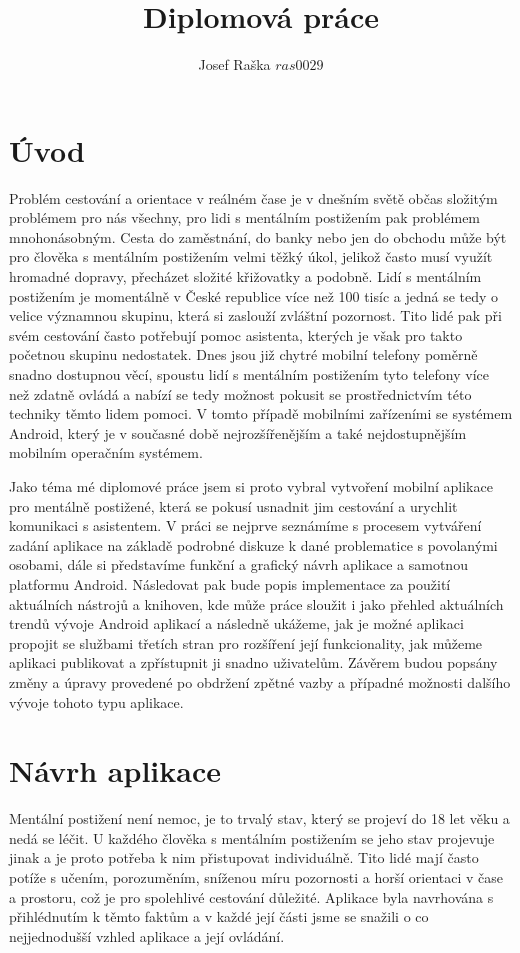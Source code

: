 \documentclass[czech,master,public,dept460,male,java,cpdeclaration]{diploma}
\title{Diplomová práce}
\author{Josef Raška \(ras0029\)}
\begin{document}
\MakeTitlePages
{}


\newpage

\section{Úvod}
Problém cestování a orientace v reálném čase je v dnešním světě občas složitým problémem pro nás všechny,
pro lidi s mentálním postižením pak problémem mnohonásobným. Cesta do zaměstnání, do banky
nebo jen do obchodu může být pro člověka s mentálním postižením velmi těžký úkol, jelikož často musí
využít hromadné dopravy, přecházet složité křižovatky a podobně. Lidí s mentálním postižením
je momentálně v České republice více než 100 tisíc\cite{komunikace} a jedná se tedy o velice
významnou skupinu, která si zaslouží zvláštní pozornost. Tito lidé pak při svém cestování často potřebují
pomoc asistenta, kterých je však pro takto početnou skupinu nedostatek.
Dnes jsou již chytré mobilní telefony poměrně snadno dostupnou věcí, spoustu lidí
s mentálním postižením tyto telefony více než zdatně ovládá a nabízí se tedy možnost pokusit se prostřednictvím
 této techniky těmto lidem pomoci. V tomto případě mobilními zařízeními se systémem Android,
 který je v současné době nejrozšířenějším a také nejdostupnějším mobilním operačním systémem.

 Jako téma mé diplomové práce jsem si proto vybral vytvoření mobilní aplikace pro mentálně postižené,
 která se pokusí usnadnit jim cestování a urychlit komunikaci s asistentem. V práci se nejprve
 seznámíme s procesem vytváření zadání aplikace na základě podrobné diskuze k dané problematice s povolanými osobami,
 dále si představíme funkční a grafický návrh aplikace a samotnou platformu Android.
 Následovat pak bude popis implementace za použití aktuálních nástrojů a knihoven, kde může práce sloužit
 i jako přehled aktuálních trendů vývoje Android aplikací a následně ukážeme, jak je možné aplikaci propojit
 se službami třetích stran pro rozšíření její funkcionality, jak
 můžeme aplikaci publikovat a zpřístupnit ji snadno uživatelům. Závěrem budou popsány
 změny a úpravy provedené po obdržení zpětné vazby
a případné možnosti dalšího vývoje tohoto typu aplikace.


\section{Návrh aplikace}
Mentální postižení není nemoc, je to trvalý stav, který se projeví do 18 let věku a nedá se léčit\cite{komunikace}.
U každého člověka s mentálním postižením se jeho stav projevuje jinak a je proto potřeba k nim
přistupovat individuálně. Tito lidé mají často potíže s učením, porozuměním, sníženou míru pozornosti
a horší orientaci v čase a prostoru\cite{komunikace}, což je pro spolehlivé cestování důležité.
Aplikace byla navrhována s přihlédnutím k těmto faktům a v každé její části jsme se snažili o co nejjednodušší
vzhled aplikace a její ovládání.
\end{document}
